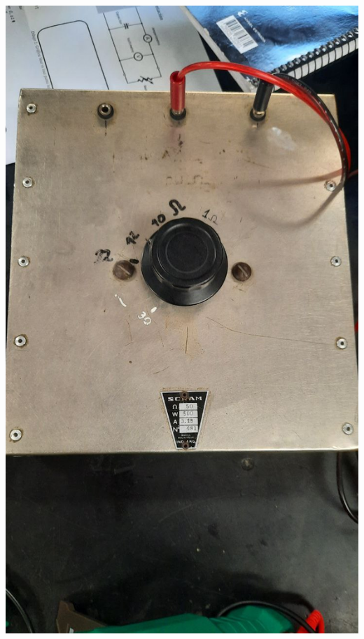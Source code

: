 \begin{center}
    \centering
    \includegraphics[width=0.9\linewidth]{./imagenes/reostato.jpg}
\end{center}

\saltoPag{}

